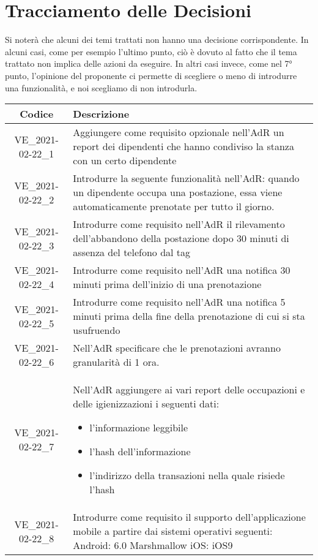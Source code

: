 \section*{Tracciamento delle Decisioni}
Si noterà che alcuni dei temi trattati non hanno una decisione corrispondente. In alcuni casi, come per esempio l'ultimo punto, ciò è dovuto al fatto che il tema trattato non implica delle azioni da eseguire. In altri casi invece, come nel 7° punto, l'opinione del proponente ci permette di scegliere o meno di introdurre una funzionalità, e noi scegliamo di non introdurla.

\begin{center}
	\begin{longtable}{|c|p{13cm}|}
	\hline
	\rowcolor{lighter-grayer}
	\textbf{Codice} & \textbf{Descrizione} \\
	\hline
	\endfirsthead

	\hline
	VE\_2021-02-22\_1 & Aggiungere come requisito opzionale nell'AdR un report dei dipendenti che hanno condiviso la stanza con un certo dipendente \\
	VE\_2021-02-22\_2 & Introdurre la seguente funzionalità nell'AdR: quando un dipendente occupa una postazione, essa viene automaticamente prenotate per tutto il giorno.  \\
	VE\_2021-02-22\_3 & Introdurre come requisito nell'AdR il rilevamento dell'abbandono della postazione dopo 30 minuti di assenza del telefono dal tag\\
	VE\_2021-02-22\_4 & Introdurre come requisito nell'AdR una notifica 30 minuti prima dell'inizio di una prenotazione \\
	VE\_2021-02-22\_5 & Introdurre come requisito nell'AdR una notifica 5 minuti prima della fine della prenotazione di cui si sta usufruendo \\
	VE\_2021-02-22\_6 & Nell'AdR specificare che le prenotazioni avranno granularità di 1 ora. \\
	VE\_2021-02-22\_7 & Nell'AdR aggiungere ai vari report delle occupazioni e delle igienizzazioni i seguenti dati:
	\begin{itemize}
		\item l'informazione leggibile
		\item l'hash dell'informazione
		\item l'indirizzo della transazioni nella quale risiede l'hash
	\end{itemize} \\
	VE\_2021-02-22\_8 & Introdurre come requisito il supporto dell'applicazione mobile a partire dai sistemi operativi seguenti:\newline
	Android: 6.0 Marshmallow\newline
	iOS: iOS9 \\							
	\hline

	\end{longtable}
\end{center}